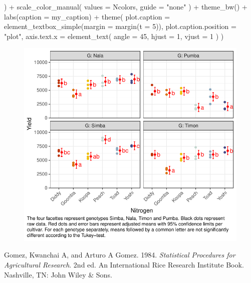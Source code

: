 \documentclass[
  letterpaper,
  DIV=11,
  numbers=noendperiod]{scrartcl}
\newenvironment{Shaded}{\begin{snugshade}}{\end{snugshade}}
\newcommand{\AttributeTok}[1]{\textcolor[rgb]{0.40,0.45,0.13}{#1}}
\newcommand{\DecValTok}[1]{\textcolor[rgb]{0.68,0.00,0.00}{#1}}
\newcommand{\FunctionTok}[1]{\textcolor[rgb]{0.28,0.35,0.67}{#1}}
\newcommand{\NormalTok}[1]{\textcolor[rgb]{0.00,0.23,0.31}{#1}}
\newcommand{\SpecialCharTok}[1]{\textcolor[rgb]{0.37,0.37,0.37}{#1}}
\newcommand{\StringTok}[1]{\textcolor[rgb]{0.13,0.47,0.30}{#1}}
\newlength{\cslhangindent}
\newlength{\cslentryspacingunit} %
\newenvironment{CSLReferences}[2] %
 {%
  \setlength{\parindent}{0pt}
  \ifodd #1
  \let\oldpar\par
  \def\par{\hangindent=\cslhangindent\oldpar}
  \fi
  \setlength{\parskip}{#2\cslentryspacingunit}
 }%
 {}
\begin{document}
\begin{Shaded}
\begin{Highlighting}[]
\NormalTok{  ) }\SpecialCharTok{+}
  \FunctionTok{scale\_color\_manual}\NormalTok{(}
    \AttributeTok{values =}\NormalTok{ Ncolors, }
    \AttributeTok{guide =} \StringTok{"none"}
\NormalTok{  ) }\SpecialCharTok{+}
  \FunctionTok{theme\_bw}\NormalTok{() }\SpecialCharTok{+}
  \FunctionTok{labs}\NormalTok{(}\AttributeTok{caption =}\NormalTok{ my\_caption) }\SpecialCharTok{+}
  \FunctionTok{theme}\NormalTok{(}
    \AttributeTok{plot.caption =} \FunctionTok{element\_textbox\_simple}\NormalTok{(}\AttributeTok{margin =} \FunctionTok{margin}\NormalTok{(}\AttributeTok{t =} \DecValTok{5}\NormalTok{)),}
    \AttributeTok{plot.caption.position =} \StringTok{"plot"}\NormalTok{,}
    \AttributeTok{axis.text.x =} \FunctionTok{element\_text}\NormalTok{(}
      \AttributeTok{angle =} \DecValTok{45}\NormalTok{,}
      \AttributeTok{hjust =} \DecValTok{1}\NormalTok{,}
      \AttributeTok{vjust =} \DecValTok{1}
\NormalTok{    )}
\NormalTok{  )}
\end{Highlighting}
\end{Shaded}

\begin{figure}[H]

{\centering \includegraphics{splitplot_gomezgomez1984_files/figure-pdf/unnamed-chunk-16-1.pdf}

}

\end{figure}

\hypertarget{refs}{}
\begin{CSLReferences}{1}{0}
\leavevmode{}%
Gomez, Kwanchai A, and Arturo A Gomez. 1984. \emph{Statistical
Procedures for Agricultural Research}. 2nd ed. An International Rice
Research Institute Book. Nashville, TN: John Wiley \& Sons.

\end{CSLReferences}
\end{document}

